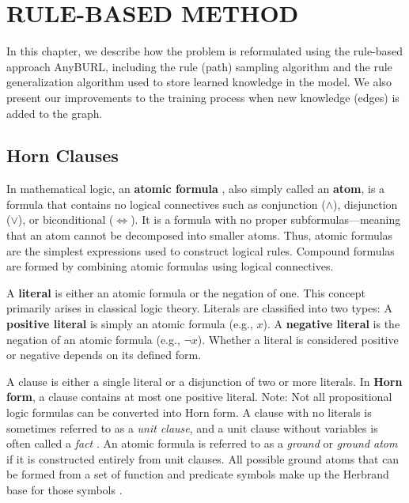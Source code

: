 \chapter{RULE-BASED METHOD}
\label{chap:RuleBase}

In this chapter, we describe how the problem is reformulated using the rule-based approach AnyBURL, including the rule (path) sampling algorithm and the rule generalization algorithm used to store learned knowledge in the model. We also present our improvements to the training process when new knowledge (edges) is added to the graph.

\section{Horn Clauses}
In mathematical logic, an \textbf{atomic formula} \cite{wiki:Atomic}, also simply called an \textbf{atom}, is a formula that contains no logical connectives such as conjunction (\(\wedge\)), disjunction (\(\vee\)), or biconditional (\(\Leftrightarrow\)). It is a formula with no proper subformulas—meaning that an atom cannot be decomposed into smaller atoms. Thus, atomic formulas are the simplest expressions used to construct logical rules. Compound formulas are formed by combining atomic formulas using logical connectives.

A \textbf{literal} \cite{wiki:Literal} is either an atomic formula or the negation of one. This concept primarily arises in classical logic theory. Literals are classified into two types: A \textbf{positive literal} is simply an atomic formula (e.g., \(x\)). A \textbf{negative literal} is the negation of an atomic formula (e.g., \(\neg x\)). Whether a literal is considered positive or negative depends on its defined form.

A clause is either a single literal or a disjunction of two or more literals. In \textbf{Horn form}, a clause contains at most one positive literal. Note: Not all propositional logic formulas can be converted into Horn form. A clause with no literals is sometimes referred to as a \textit{unit clause}, and a unit clause without variables is often called a \textit{fact} \cite{wiki:Horn}. An atomic formula is referred to as a \textit{ground} or \textit{ground atom} if it is constructed entirely from unit clauses. All possible ground atoms that can be formed from a set of function and predicate symbols make up the Herbrand base for those symbols \cite{wiki:Term}.





